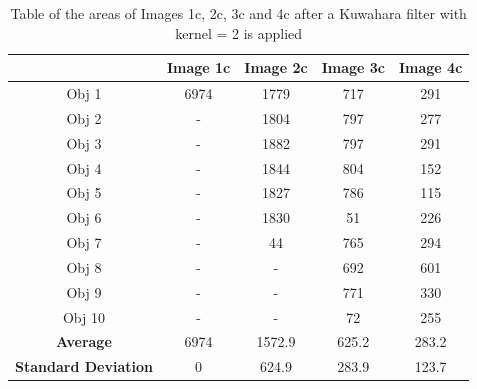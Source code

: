 \documentclass[runningheads]{llncs}
\begin{document}
\begin{table}[h!]
\centering
\begin{tabular}{|c|c|c|c|c|}
\hline
\textbf{} & \textbf{Image 1c} & \textbf{Image 2c} & \textbf{Image 3c} & \textbf{Image 4c} \\
\hline
Obj 1 & 6974      & 1779  & 717 &  291 \\ \hline
Obj 2 &  -          & 1804  & 797 & 277\\ \hline
Obj 3 &   -         & 1882 & 797 &  291\\ \hline
Obj 4 &   -         & 1844  & 804 &  152\\ \hline
Obj 5 &   -         & 1827 & 786 &  115\\ \hline
Obj 6 &   -         & 1830 & 51 &  226\\ \hline
Obj 7 &   -         &  44     & 765 &  294\\ \hline
Obj 8 &   -         &  -     & 692 &  601 \\ \hline
Obj 9 &    -        &  -     &  771    & 330\\ \hline
Obj 10 &  -          &  -     &  72    & 255\\ \hline
\textbf{Average} &   6974  &  1572.9   &   625.2   & 283.2  \\ \hline
\textbf{Standard Deviation} &  0      &  624.9     &    283.9 & 123.7 \\ \hline
\end{tabular}
\caption{Table of the areas of Images 1c, 2c, 3c and 4c after a Kuwahara filter with kernel = 2 is applied}
\label{tab:Area-SeriesC-Kuwahara2}
\end{table}
\end{document}
